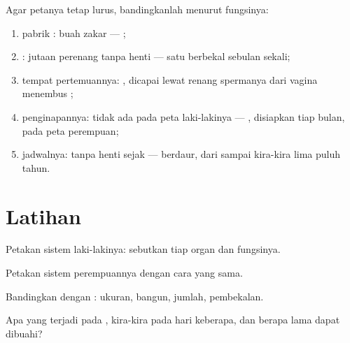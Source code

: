 \begin{method}\label{met:g8:reproductive-systems:sides}
Agar petanya tetap lurus, bandingkanlah menurut fungsinya:
\begin{enumerate}
  \item pabrik : buah zakar --- ;
  \item {}: jutaan perenang tanpa henti --- satu  berbekal sebulan sekali;
  \item tempat pertemuannya: , dicapai lewat
        renang spermanya dari vagina menembus ;
  \item penginapannya: tidak ada pada peta laki-lakinya ---
        , disiapkan tiap bulan, pada peta perempuan;
  \item jadwalnya: tanpa henti sejak  --- berdaur,
        dari  sampai kira-kira lima puluh tahun.
\end{enumerate}
\end{method}

\section{Latihan}

\begin{exercise}[$\star$]\label{exo:g8:reproductive-systems:1}
Petakan sistem laki-lakinya: sebutkan tiap organ dan fungsinya.
\end{exercise}

\begin{exercise}[$\star$]\label{exo:g8:reproductive-systems:2}
Petakan sistem perempuannya dengan cara yang sama.
\end{exercise}

\begin{exercise}[$\star$]\label{exo:g8:reproductive-systems:3}
Bandingkan  dengan : ukuran, bangun,
jumlah, pembekalan.
\end{exercise}

\begin{exercise}[$\star$]\label{exo:g8:reproductive-systems:4}
Apa yang terjadi pada , kira-kira pada hari keberapa,
dan berapa lama  dapat dibuahi?
\end{exercise}

